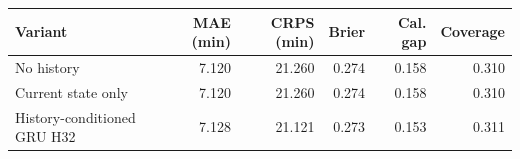 \begin{tabular}{lrrrrr}
\toprule
Variant & MAE (min) & CRPS (min) & Brier & Cal. gap & Coverage \\
\midrule
No history & 7.120 & 21.260 & 0.274 & 0.158 & 0.310 \\
Current state only & 7.120 & 21.260 & 0.274 & 0.158 & 0.310 \\
History-conditioned GRU H32 & 7.128 & 21.121 & 0.273 & 0.153 & 0.311 \\
\bottomrule
\end{tabular}
